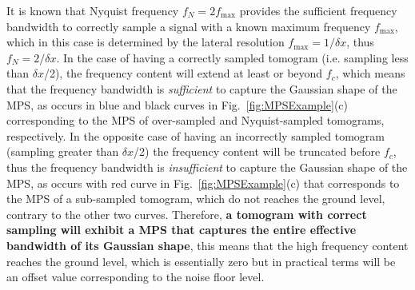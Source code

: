 It is known that Nyquist frequency $f_N = 2f_{\text{max}}$ provides the sufficient frequency bandwidth to correctly sample a signal with a known maximum frequency $f_{\text{max}}$, which in this case is determined by the lateral resolution $f_{\text{max}} = 1 / \delta x$, thus $f_N=2/\delta x$. In the case of having a correctly sampled tomogram (i.e. sampling less than $\delta x$/2), the frequency content will extend at least or beyond $f_c$, which means that the frequency bandwidth is \textit{sufficient} to capture the Gaussian shape of the MPS, as occurs in blue and black curves in Fig.~\ref{fig:MPSExample}(c) corresponding to the MPS of over-sampled and Nyquist-sampled tomograms, respectively. In the opposite case of having an incorrectly sampled tomogram (sampling greater than $\delta x$/2) the frequency content will be truncated before $f_c$, thus the frequency bandwidth is \textit{insufficient} to capture the Gaussian shape of the MPS, as occurs with red curve in Fig.~\ref{fig:MPSExample}(c) that corresponds to the MPS of a sub-sampled tomogram, which do not reaches the ground level, contrary to the other two curves. Therefore, \textbf{a tomogram with correct sampling will exhibit a MPS that captures the entire effective bandwidth of its Gaussian shape}, this means that the high frequency content reaches the ground level, which is essentially zero but in practical terms will be an offset value corresponding to the noise floor level.

